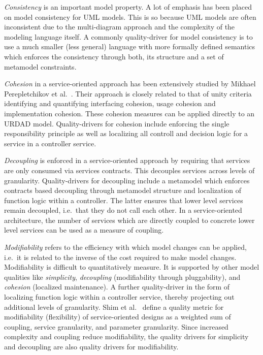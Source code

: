 \emph{Consistency} is an important model property. A lot of emphasis has been placed on model consistency for UML models. This is so because UML models are often inconsistent due to the multi-diagram approach and the complexity of the modeling language itself\cite{lange_empirical_2004}. A commonly quality-driver for model consistency is to use a much smaller (less general) language with more formally defined semantics which enforces the consistency through both, its structure and a set of metamodel constraints.

\emph{Cohesion} in a service-oriented approach has been extensively studied by Mikhael Perepletchikov et al.\ \cite{perepletchikov_cohesion_2007,perepletchikov_impact_2010}. Their approach is closely related to that of unity criteria \cite{gonzalez_unity_2009} identifying and quantifying interfacing cohesion, usage cohesion and implementation cohesion. These cohesion measures can be applied directly to an URDAD model. Quality-drivers for cohesion include enforcing the single responsibility principle as well as localizing all controll and decision logic for a service in a controller service. 

\emph{Decoupling} is enforced in a service-oriented approach by requiring that services are only consumed via services contracts. This decouples services across levels of granularity. Quality-drivers for decoupling include a metamodel which enforces contracts based decoupling through metamodel structure and localization of function logic within a controller. The latter ensures that lower level services remain decoupled, i.e.\ that they do not call each other. In a service-oriented architecture, the number of services which are directly coupled to concrete lower level services can be used as a measure of coupling\cite{shim_design_2008}.

\emph{Modifiability} refers to the efficiency with which model changes can be applied, i.e.\ it is related to the inverse of the cost required to make model changes. Modifiability is difficult to quantitatively measure. It is supported by other model qualities like \emph{simplicity},  \emph{decoupling} (modifiability through pluggability), and \emph{cohesion} (localized maintenance). A further quality-driver in the form of localizing function logic within a controller service, thereby projecting out additional levels of granularity. Shim et al.\ \cite{shim_design_2008} define a quality metric for modifiability (flexibility) of service-oriented designs as a weighted sum of coupling, service granularity, and parameter granularity. Since increased complexity and coupling reduce modifiability, the quality drivers for simplicity and decoupling are also quality drivers for modifiability.

